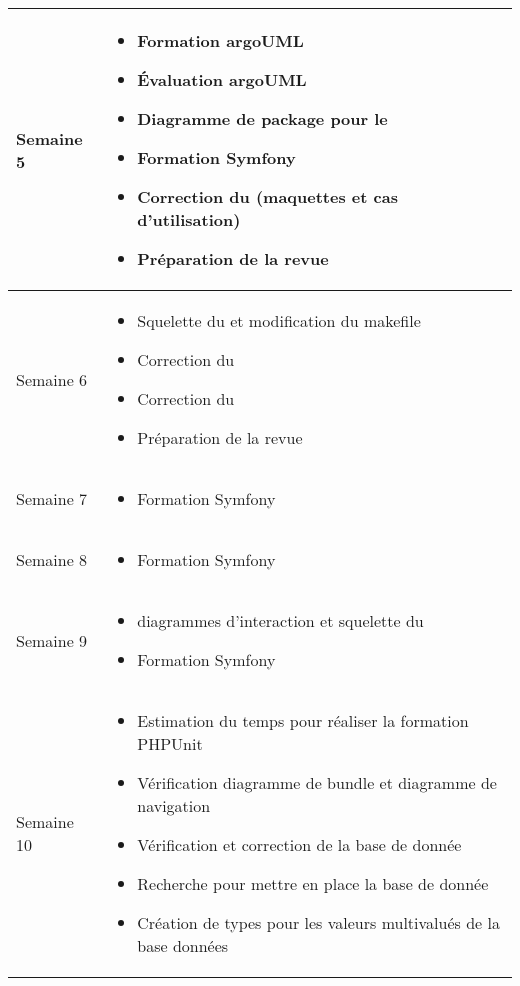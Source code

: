 \documentclass [a4paper] {article}
\begin{document}
\section*{\Melissa}

\centering
	\begin{longtable}{|>{\columncolor{gray!40}}p{2cm}|p{12cm}|}
	\hline
	Semaine 5 & \begin{itemize}
		\item Formation argoUML
		\item Évaluation argoUML
		\item Diagramme de package pour le \DCPCourt
		\item Formation Symfony
		\item Correction du \DSICourt (maquettes et cas d'utilisation)
		\item Préparation de la revue
		\end{itemize} \\
	\hline
	
	Semaine 6 & \begin{itemize}
		\item Squelette du \DCPCourt{} et modification du makefile
		\item Correction du \DSECourt
		\item Correction du \DSICourt
		\item Préparation de la revue
		\end{itemize} \\
	\hline
	
	Semaine 7 & \begin{itemize}
		\item Formation Symfony
		\end{itemize} \\
	\hline
	
	Semaine 8 & \begin{itemize}
		\item Formation Symfony
		\end{itemize} \\
	\hline
	
	Semaine 9 & \begin{itemize}
		\item diagrammes d’interaction et squelette du \DCPCourt
		\item Formation Symfony
		\end{itemize} \\
	\hline
	
	Semaine 10 & \begin{itemize}
		\item Estimation du temps pour réaliser la formation PHPUnit
		\item Vérification diagramme de bundle et diagramme de navigation
		\item Vérification et correction de la base de donnée
		\item Recherche pour mettre en place la base de donnée 
		\item Création de types pour les valeurs multivalués de la base données
		\end{itemize} \\
	\hline
	

\end{longtable}
\end{document}
